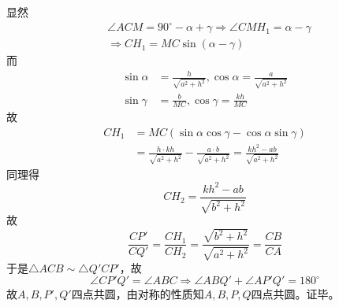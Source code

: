 显然
\begin{align*}
  & \angle ACM = 90^\circ - \alpha + \gamma \Rightarrow \angle CMH_1 = \alpha - \gamma \\
  &\Rightarrow CH_1 = MC\sin(\alpha - \gamma)
\end{align*}
而
\begin{align*}
  \sin\alpha &= \frac h{\sqrt{a^2 + h^2}}, \cos\alpha = \frac a{\sqrt{a^2 + h^2}} \\
  \sin\gamma &= \frac b{MC}, \cos\gamma = \frac{kh}{MC}
\end{align*}
故
\begin{align*}
  CH_1 &= MC(\sin\alpha\cos\gamma - \cos\alpha\sin\gamma) \\
  &= \frac{h\cdot kh}{\sqrt{a^2 + h^2}} - \frac{a\cdot b}{\sqrt{a^2 + h^2}} = \frac{kh^2 - ab}{\sqrt{a^2 + h^2}}
\end{align*}
同理得
\[ CH_2 = \frac{kh^2 - ab}{\sqrt{b^2 + h^2}} \]
故
\[ \frac{CP'}{CQ'} = \frac{CH_1}{CH_2} = \frac{\sqrt{b^2 + h^2}}{\sqrt{a^2 + h^2}} = \frac{CB}{CA} \]
于是$\triangle ACB \sim \triangle Q'CP'$，故
\[ \angle CP'Q' = \angle ABC \Rightarrow \angle ABQ' + \angle AP'Q' = 180^\circ \]
故$A, B, P', Q'$四点共圆，由对称的性质知$A, B, P, Q$四点共圆。证毕。
